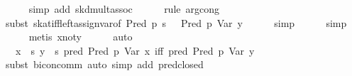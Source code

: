 \begin{isabellebody}
\ \ \ \ \isamarkupfalse%
\ {}simp\ add{}\ skd{}mult{}assoc{}\isanewline
\ \ \ \ \isamarkupfalse%
\ {}rule\ arg{}cong{}\ \isamarkupfalse%
\isanewline
\ \ \ \ \isamarkupfalse%
\ {}subst\ skat{}iff{}left{}assign{}var{}of\ {}Pred\ p\ {}s{}{}\ {}\ {}\ {}Pred\ p\ {}Var\ y{}{}{}{}\isanewline
\ \ \ \ \isamarkupfalse%
\ simp\isanewline
\ \ \ \ \isamarkupfalse%
\ simp\isanewline
\ \ \ \ \isamarkupfalse%
\ {}metis\ x{}not{}y{}\isanewline
\ \ \ \ \isamarkupfalse%
\ auto\isanewline
\ \ \isamarkupfalse%
\ \isamarkupfalse%
\ {}{}{}{}\ {}\ x\ {}{}\ s{}\ y\ {}{}\ s{}\ pred\ {}Pred\ p\ {}Var\ x{}{}\ iff\ pred\ {}Pred\ p\ {}Var\ y{}{}{}\isanewline
\ \ \ \ \isamarkupfalse%
\ {}subst\ bicon{}comm{}\ {}auto\ simp\ add{}\ pred{}closed{}\isanewline

\end{isabellebody}
